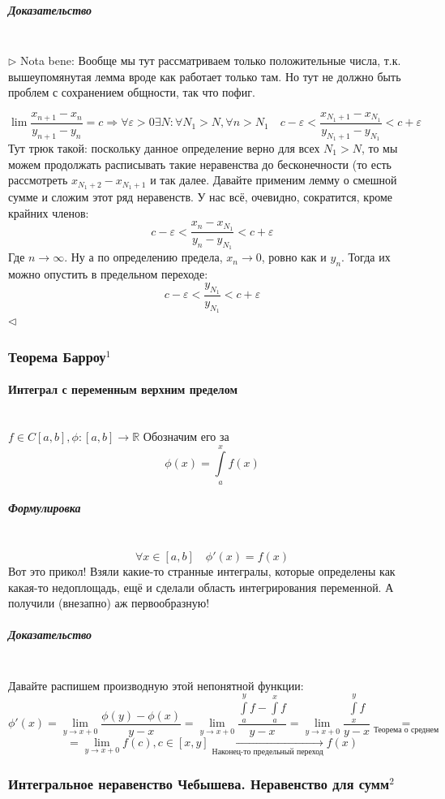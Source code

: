 \documentclass{article}
\let\vanillaparagraph\paragraph
\let\vanillasubparagraph\subparagraph
\renewcommand{\paragraph}[1]{\vanillaparagraph{#1}\mbox{}\\}
\renewcommand{\subparagraph}[1]{\vanillasubparagraph{#1}\mbox{}\\}
\begin{document}
\subparagraph{Доказательство}
$\rhd$
Nota bene: Вообще мы тут рассматриваем только положительные числа, т.к. вышеупомянутая лемма вроде как работает только там. Но тут не должно быть проблем с сохранением общности, так что пофиг.

$$
\lim \frac{x_{n+1} - x_{n}}{y_{n+1} - y_n} = c \Rightarrow \forall \varepsilon > 0 \exists N: \forall N_1 > N, \forall n > N_1 \quad c-\varepsilon < \frac{x_{N_1+1} - x_{N_1}}{y_{N_1+1} - y_{N_1}} < c + \varepsilon
$$
Тут трюк такой: поскольку данное определение верно для всех $N_1 > N$, то мы можем продолжать расписывать такие неравенства до бесконечности (то есть рассмотреть $x_{N_1 + 2} - x_{N_1+1}$ и так далее. Давайте применим лемму о смешной сумме и сложим этот ряд неравенств. У нас всё, очевидно, сократится, кроме крайних членов:
$$
c-\varepsilon < \frac{x_{n} - x_{N_1}}{y_{n} - y_{N_1}} < c + \varepsilon
$$
Где $n \rightarrow \infty$. Ну а по определению предела, $x_n \rightarrow 0$, ровно как и $y_n$. Тогда их можно опустить в предельном переходе: 
$$
c-\varepsilon < \frac{y_{N_1}}{y_{N_1}} < c + \varepsilon
$$
$\lhd$

\subsubsection{Теорема Барроу\texorpdfstring{$^1$}{}}
\paragraph{Интеграл с переменным верхним пределом}
$f\in C[a, b], \phi: [a, b] \rightarrow \mathbb{R}$
Обозначим его за 
$$
\phi(x) = \int\limits_a^x f(x) 
$$

\subparagraph{Формулировка}
$$
\forall x\in [a, b] \quad \phi'(x) = f(x)
$$
Вот это прикол! Взяли какие-то странные интегралы, которые определены как какая-то недоплощадь, ещё и сделали область интегрирования переменной. А получили (внезапно) аж первообразную! 

\subparagraph{Доказательство}

Давайте распишем производную этой непонятной функции:
$$
\phi'(x) = \lim_{y\rightarrow x+0}\frac{\phi(y)-\phi(x)}{y-x} = \lim_{y\rightarrow x+0}\frac{\int\limits_a^y f - \int\limits_a^x f}{y-x} = \lim_{y\rightarrow x+0}\frac{\int\limits_x^y f}{y-x} \underset{\text{Теорема о среднем}}{=}
$$
$$
=\lim_{y\rightarrow x+0}f(c), c \in [x, y] \underset{\text{Наконец-то предельный переход}}{\longrightarrow} f(x)
$$

\subsubsection{Интегральное неравенство Чебышева. Неравенство для сумм\texorpdfstring{$^2$}{}}
\end{document}
